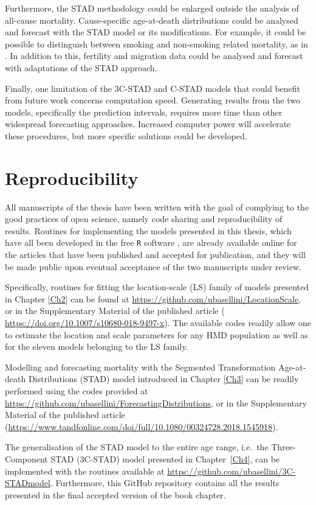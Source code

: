 \documentclass[Thesis]{subfiles}
\begin{document}
Furthermore, the STAD methodology could be enlarged outside the analysis of all-cause mortality. Cause-specific age-at-death distributions could be analysed and forecast with the STAD model or its modifications. For example, it could be possible to distinguish between smoking and non-smoking related mortality, as in \cite{janssen2013smoking}. In addition to this, fertility and migration data could be analysed and forecast with adaptations of the STAD approach.

Finally, one limitation of the 3C-STAD and C-STAD models that could benefit from future work concerns computation speed. Generating results from the two models, specifically the prediction intervals, requires more time than other widespread forecasting approaches. Increased computer power will accelerate these procedures, but more specific solutions could be developed.

\section{Reproducibility}\label{Sec:Ch1sec11}
All manuscripts of the thesis have been written with the goal of complying to the good practices of open science, namely code sharing and reproducibility of results. Routines for implementing the models presented in this thesis, which have all been developed in the free \texttt{R} software \citep{Rcite}, are already available online for the articles that have been published and accepted for publication, and they will be made public upon eventual acceptance of the two manuscripts under review. 

Specifically, routines for fitting the location-scale (LS) family of models presented in Chapter \ref{Ch2} can be found at  \url{https://github.com/ubasellini/LocationScale}, or in the Supplementary Material of the published article (\url{ https://doi.org/10.1007/s10680-018-9497-x}). The available codes readily allow one to estimate the location and scale parameters for any HMD population as well as for the eleven models belonging to the LS family.

Modelling and forecasting mortality with the Segmented Transformation Age-at-death Distributions (STAD) model introduced in Chapter \ref{Ch3} can be readily performed using the codes provided at \url{https://github.com/ubasellini/ForecastingDistributions}, or in the Supplementary Material of the published article (\url{https://www.tandfonline.com/doi/full/10.1080/00324728.2018.1545918}).

The generalisation of the STAD model to the entire age range, i.e.~the Three-Component STAD (3C-STAD) model presented in Chapter~\ref{Ch4}, can be implemented with the routines available at \url{https://github.com/ubasellini/3C-STADmodel}. Furthermore, this GitHub repository contains all the results presented in the final accepted version of the book chapter.
\end{document}
